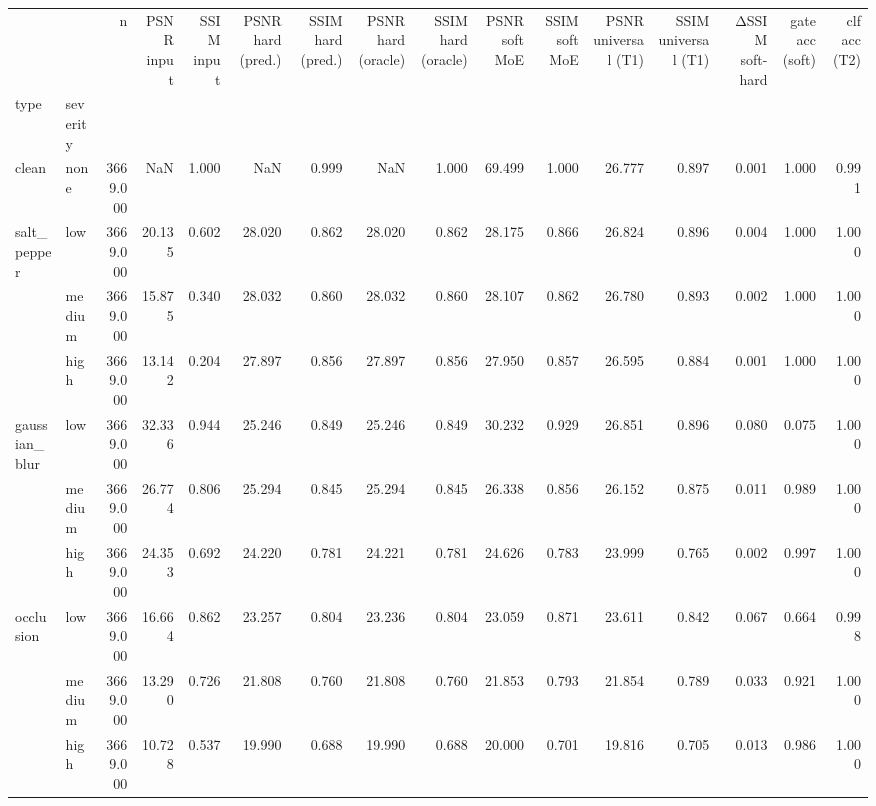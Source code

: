 \begin{tabular}{llrrrrrrrrrrrrrr}
\toprule
 &  & n & PSNR input & SSIM input & PSNR hard (pred.) & SSIM hard (pred.) & PSNR hard (oracle) & SSIM hard (oracle) & PSNR soft MoE & SSIM soft MoE & PSNR universal (T1) & SSIM universal (T1) & ΔSSIM soft-hard & gate acc (soft) & clf acc (T2) \\
type & severity &  &  &  &  &  &  &  &  &  &  &  &  &  &  \\
\midrule
clean & none & 3669.000 & NaN & 1.000 & NaN & 0.999 & NaN & 1.000 & 69.499 & 1.000 & 26.777 & 0.897 & 0.001 & 1.000 & 0.991 \\
\cline{1-16}
\multirow[t]{3}{*}{salt_pepper} & low & 3669.000 & 20.135 & 0.602 & 28.020 & 0.862 & 28.020 & 0.862 & 28.175 & 0.866 & 26.824 & 0.896 & 0.004 & 1.000 & 1.000 \\
 & medium & 3669.000 & 15.875 & 0.340 & 28.032 & 0.860 & 28.032 & 0.860 & 28.107 & 0.862 & 26.780 & 0.893 & 0.002 & 1.000 & 1.000 \\
 & high & 3669.000 & 13.142 & 0.204 & 27.897 & 0.856 & 27.897 & 0.856 & 27.950 & 0.857 & 26.595 & 0.884 & 0.001 & 1.000 & 1.000 \\
\cline{1-16}
\multirow[t]{3}{*}{gaussian_blur} & low & 3669.000 & 32.336 & 0.944 & 25.246 & 0.849 & 25.246 & 0.849 & 30.232 & 0.929 & 26.851 & 0.896 & 0.080 & 0.075 & 1.000 \\
 & medium & 3669.000 & 26.774 & 0.806 & 25.294 & 0.845 & 25.294 & 0.845 & 26.338 & 0.856 & 26.152 & 0.875 & 0.011 & 0.989 & 1.000 \\
 & high & 3669.000 & 24.353 & 0.692 & 24.220 & 0.781 & 24.221 & 0.781 & 24.626 & 0.783 & 23.999 & 0.765 & 0.002 & 0.997 & 1.000 \\
\cline{1-16}
\multirow[t]{3}{*}{occlusion} & low & 3669.000 & 16.664 & 0.862 & 23.257 & 0.804 & 23.236 & 0.804 & 23.059 & 0.871 & 23.611 & 0.842 & 0.067 & 0.664 & 0.998 \\
 & medium & 3669.000 & 13.290 & 0.726 & 21.808 & 0.760 & 21.808 & 0.760 & 21.853 & 0.793 & 21.854 & 0.789 & 0.033 & 0.921 & 1.000 \\
 & high & 3669.000 & 10.728 & 0.537 & 19.990 & 0.688 & 19.990 & 0.688 & 20.000 & 0.701 & 19.816 & 0.705 & 0.013 & 0.986 & 1.000 \\
\cline{1-16}
\bottomrule
\end{tabular}
